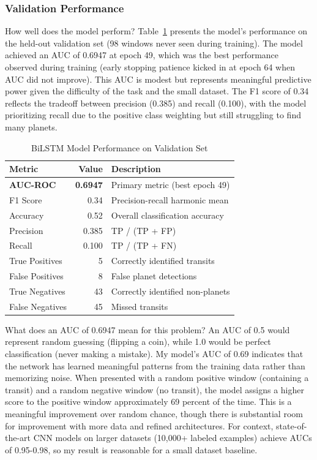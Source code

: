\documentclass[letterpaper]{article} %
\begin{document}
\subsubsection{Validation Performance}

How well does the model perform? Table~\ref{tab:bilstm_performance} presents the model's performance on the held-out validation set (98 windows never seen during training). The model achieved an AUC of 0.6947 at epoch 49, which was the best performance observed during training (early stopping patience kicked in at epoch 64 when AUC did not improve). This AUC is modest but represents meaningful predictive power given the difficulty of the task and the small dataset. The F1 score of 0.34 reflects the tradeoff between precision (0.385) and recall (0.100), with the model prioritizing recall due to the positive class weighting but still struggling to find many planets.

\begin{table}[h]
    \centering
    \caption{BiLSTM Model Performance on Validation Set}
    \label{tab:bilstm_performance}
    \begin{tabular}{@{}lrp{4cm}@{}}
        \toprule
        \textbf{Metric} & \textbf{Value} & \textbf{Description} \\
        \midrule
        \textbf{AUC-ROC} & \textbf{0.6947} & Primary metric (best epoch 49) \\
                F1 Score & 0.34 & Precision-recall harmonic mean \\
                Accuracy & 0.52 & Overall classification accuracy \\
                Precision & 0.385 & TP / (TP + FP) \\
                Recall & 0.100 & TP / (TP + FN) \\
                True Positives & 5 & Correctly identified transits \\
                False Positives & 8 & False planet detections \\
                True Negatives & 43 & Correctly identified non-planets \\
                False Negatives & 45 & Missed transits \\
        \bottomrule
    \end{tabular}
\end{table}

What does an AUC of 0.6947 mean for this problem? An AUC of 0.5 would represent random guessing (flipping a coin), while 1.0 would be perfect classification (never making a mistake). My model's AUC of 0.69 indicates that the network has learned meaningful patterns from the training data rather than memorizing noise. When presented with a random positive window (containing a transit) and a random negative window (no transit), the model assigns a higher score to the positive window approximately 69 percent of the time. This is a meaningful improvement over random chance, though there is substantial room for improvement with more data and refined architectures. For context, state-of-the-art CNN models on larger datasets (10,000+ labeled examples) achieve AUCs of 0.95-0.98, so my result is reasonable for a small dataset baseline.
\end{document}

